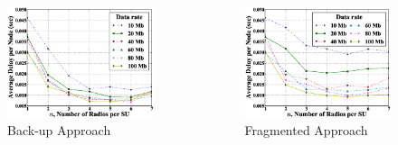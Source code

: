\begin{columns}
    \begin{column}{0.5\textwidth}\centering
    \begin{figure}[!htbp]
    \begin{center}
    \includegraphics[scale=0.25]{figures/delay_backup_datarate}
    \caption{Back-up Approach}
    \end{center}
    \end{figure}
    \end{column}
    \begin{column}{0.5\textwidth}\centering
    \begin{figure}[!htbp]
    \begin{center}
    \includegraphics[scale=0.25]{figures/delay_fragmented_datarate}
    \caption{Fragmented Approach}
    \end{center}
    \end{figure}
    \end{column}
\end{columns}
\begin{center}
\end{center}
